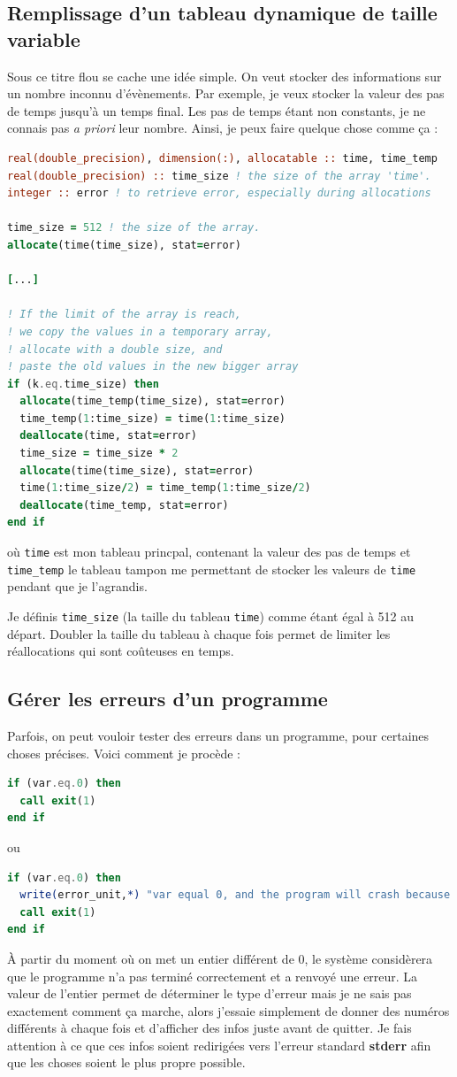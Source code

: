 \documentclass[a4paper,twoside]{article}
\begin{document}
\subsection{Remplissage d'un tableau dynamique de taille variable}
Sous ce titre flou se cache une idée simple. On veut stocker des informations sur un nombre inconnu d'évènements. Par exemple, je veux stocker la valeur des pas de temps jusqu'à un temps final. Les pas de temps étant non constants, je ne connais pas \emph{a priori} leur nombre. Ainsi, je peux faire quelque chose comme ça : 
\begin{lstlisting}[language=Fortran]
real(double_precision), dimension(:), allocatable :: time, time_temp
real(double_precision) :: time_size ! the size of the array 'time'. 
integer :: error ! to retrieve error, especially during allocations

time_size = 512 ! the size of the array. 
allocate(time(time_size), stat=error)

[...]

! If the limit of the array is reach, 
! we copy the values in a temporary array, 
! allocate with a double size, and 
! paste the old values in the new bigger array
if (k.eq.time_size) then
  allocate(time_temp(time_size), stat=error)
  time_temp(1:time_size) = time(1:time_size)
  deallocate(time, stat=error)
  time_size = time_size * 2
  allocate(time(time_size), stat=error)
  time(1:time_size/2) = time_temp(1:time_size/2)
  deallocate(time_temp, stat=error)
end if
\end{lstlisting}
où \texttt{time} est mon tableau princpal, contenant la valeur des pas de temps et \texttt{time\_temp} le tableau tampon me permettant de stocker les valeurs de \texttt{time} pendant que je l'agrandis.

Je définis \texttt{time\_size} (la taille du tableau \texttt{time}) comme étant égal à 512 au départ. Doubler la taille du tableau à chaque fois permet de limiter les réallocations qui sont coûteuses en temps. 

\subsection{Gérer les erreurs d'un programme}
Parfois, on peut vouloir tester des erreurs dans un programme, pour certaines choses précises. Voici comment je procède : 
\begin{lstlisting}[language=Fortran]
if (var.eq.0) then
  call exit(1)
end if
\end{lstlisting}
ou
\begin{lstlisting}[language=Fortran]
if (var.eq.0) then
  write(error_unit,*) "var equal 0, and the program will crash because of that"
  call exit(1)
end if
\end{lstlisting}
À partir du moment où on met un entier différent de 0, le système considèrera que le programme n'a pas terminé correctement et a renvoyé une erreur. La valeur de l'entier permet de déterminer le type d'erreur mais je ne sais pas exactement comment ça marche, alors j'essaie simplement de donner des numéros différents à chaque fois et d'afficher des infos juste avant de quitter. Je fais attention à ce que ces infos soient redirigées vers l'erreur standard \textbf{stderr} afin que les choses soient le plus propre possible.
\end{document}
